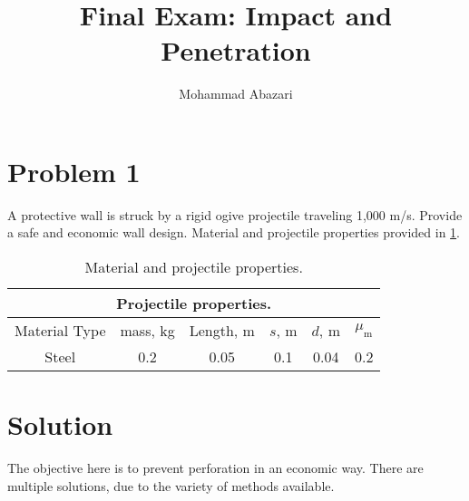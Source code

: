 \documentclass[]{article} %
\title{Final Exam: Impact and Penetration}
\author{Mohammad Abazari}
\date{} %
\begin{document}
\maketitle

\section*{Problem 1}
A protective wall is struck by a rigid ogive projectile traveling 1,000 m/s. Provide a safe and economic wall design. Material and projectile properties provided in \ref{tab02}.

\begin{table}[htbp]
  \centering
  \caption{Material and projectile properties.}
    \begin{tabular}{cccccc}
\multicolumn{6}{c}{Projectile properties.} \\
    \midrule
    Material Type &{mass, kg} & {Length, m} &{$s$, m} &{$d$, m} & {{$\mu_\mathrm{m}$}} \\
    \midrule
    Steel & 0.2   & 0.05  & 0.1   & 0.04  & 0.2 \\
        \bottomrule
    \end{tabular}%
  \label{tab02}%
\end{table}%

\section*{Solution}
The objective here is to prevent perforation in an economic way. There are multiple solutions, due to the variety of methods available.
\end{document}
